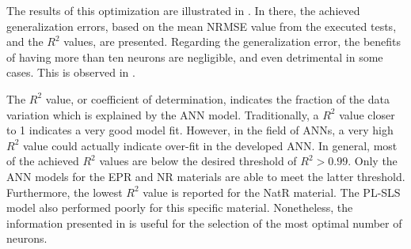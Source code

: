 The results of this optimization are illustrated in . In there, the achieved generalization errors, based on the mean NRMSE value from the executed tests, and the $R^2$ values, are presented. Regarding the generalization error, the benefits of having more than ten neurons are negligible, and even detrimental in some cases. This is observed in .

The $R^2$ value, or coefficient of determination, indicates the fraction of the data variation which is explained by the ANN model. Traditionally, a $R^2$ value closer to 1 indicates a very good model fit. However, in the field of ANNs, a very high $R^2$ value could actually indicate over-fit in the developed ANN. In general, most of the achieved $R^2$ values are below the desired threshold of $R^2>0.99$. Only the ANN models for the EPR and NR materials are able to meet the latter threshold. Furthermore, the lowest $R^2$ value is reported for the NatR material. The PL-SLS model also performed poorly for this specific material. Nonetheless, the information presented in  is useful for the selection of the most optimal number of neurons.


